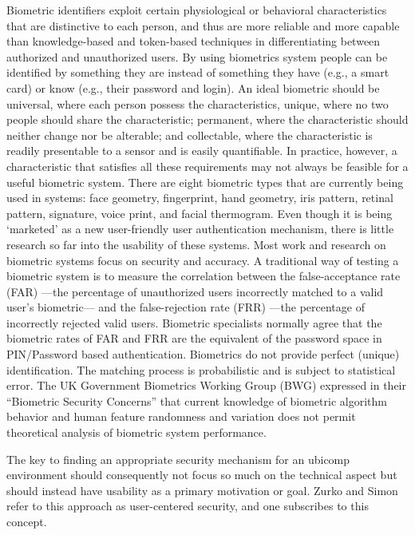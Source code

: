 \documentclass{article}
\begin{document}
Biometric identifiers exploit certain physiological or behavioral characteristics that are distinctive to each person, and thus are more reliable and more capable than knowledge-based and token-based techniques in differentiating between authorized and unauthorized users. By using biometrics system people can be identified by something they are instead of something they have (e.g., a smart card) or know (e.g., their password and login).
An ideal biometric should be universal, where each person possess the characteristics, unique, where no two people should share the characteristic; permanent, where the characteristic should neither change nor be alterable; and collectable, where the characteristic is readily presentable to a sensor and is easily quantifiable. In practice, however, a characteristic that satisfies all these requirements may not always be feasible for a useful biometric system. \cite{}
There are eight biometric types that are currently being used in systems: face geometry, fingerprint, hand geometry, iris pattern, retinal pattern, signature, voice print, and facial thermogram. Even though it is being ‘marketed’ as a new user-friendly user authentication mechanism, there is little research so far into the usability of these systems. Most work and research on biometric systems focus on security and accuracy. 
A traditional way of testing a biometric system is to measure the correlation between the false-acceptance rate (FAR) ---the percentage of unauthorized users incorrectly matched to a valid user’s biometric--- and the false-rejection rate (FRR) ---the percentage of incorrectly rejected valid users. Biometric specialists normally agree that the biometric rates of FAR and FRR are the equivalent of the password space in PIN/Password based authentication.\cite{} Biometrics do not provide perfect (unique) identification. The matching process is probabilistic and is subject to statistical error.    The UK Government Biometrics Working Group (BWG) expressed in their “Biometric Security Concerns” that current knowledge of biometric algorithm behavior and human feature randomness and variation does not permit theoretical analysis of biometric system performance. \cite{}

The key to finding an appropriate security mechanism for an ubicomp environment should consequently not focus so much on the technical aspect but should instead have usability as a primary motivation or goal.  Zurko and Simon \cite{} refer to this approach as user-centered security, and one subscribes to this concept. 
\end{document}
